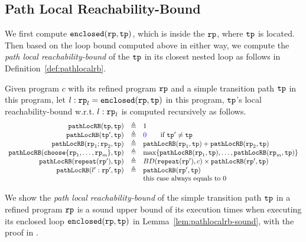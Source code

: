 \subsection{Path Local Reachability-Bound}
We first compute $\mathtt{enclosed}(\mathtt{rp}, \mathtt{tp})$, which is  inside the $\mathtt{rp}$, where $\mathtt{tp}$ is located.
\\
Then based on the loop bound computed above in either way, we compute the \emph{path local reachability-bound} of
the $\mathtt{tp}$ in its closest nested loop as follows in Definition~\ref{def:pathlocalrb}.
\begin{defn}
    \label{def:pathlocalrb}
    Given program $c$ with its refined program $\mathtt{rp}$ and a simple transition path $\mathtt{tp}$ in this program, 
    let $l: \mathtt{rp}_l = \mathtt{enclosed}(\mathtt{rp}, \mathtt{tp})$ in this program,
    $\mathtt{tp}$'s local reachability-bound w.r.t. $l: \mathtt{rp}_l$
    is computed recursively as follows. 
  \[
    \begin{array}{rcl}
      \outinB(\tpath, \tpath) & \triangleq & 1 \\
      \outinB(\tpath', \tpath) & \triangleq & \highlight{0} \qquad \text{if } \tpath' \neq \tpath\\
      \outinB(\rprog_1;\rprog_2, \tpath) & \triangleq & \outinB(\rprog_1, \tpath) + \outinB(\rprog_2, \tpath) \\
      \outinB(\rpchoose{\rprog_1, \ldots, \rprog_m }, \tpath) & \triangleq 
      & \max\left\{ \outinB(\rprog_1, \tpath), \ldots, \outinB(\rprog_m, \tpath) \right\} \\
      \outinB(\rprepeat(\rprog'), \tpath) & \triangleq 
      & BD(\rprepeat(\rprog'), c)
       \times \outinB(\rprog', \tpath)
       \\
      \outinB(l': \rprog', \tpath) & \triangleq & \outinB(\rprog', \tpath) \\
      &  & \text{this case always equals to } 0 \\
    \end{array}
    \]
\end{defn}
We show the \emph{path local reachability-bound} of the simple transition path $\mathtt{tp}$ in a refined program $\mathtt{rp}$ is a sound upper bound of its execution times when executing its enclosed loop $\mathtt{enclosed}(\mathtt{rp}, \mathtt{tp})$ in Lemma~\ref{lem:pathlocalrb-sound}, with the proof in .
